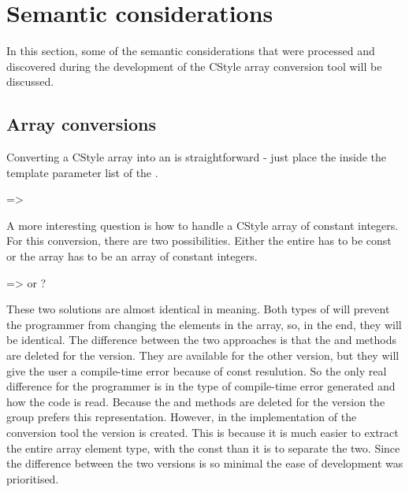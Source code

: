 
\section{Semantic considerations}

In this section, some of the semantic considerations that were processed and discovered during the development of the CStyle array conversion tool will be discussed. 

\subsection{Array conversions} \label{subsec:095:030:array_conversions}

Converting a CStyle  array into an  is straightforward - just place the  inside the template parameter list of the . 

 => 

A more interesting question is how to handle a CStyle array of constant integers. For this conversion, there are two possibilities. Either the entire  has to be const or the array has to be an array of constant integers.

 =>  or ?

These two solutions are almost identical in meaning. Both types of  will prevent the programmer from changing the elements in the array, so, in the end, they will be identical. The difference between the two approaches is that the  and  methods are deleted for the  version. They are available for the other version, but they will give the user a compile-time error because of const resulution. So the only real difference for the programmer is in the type of compile-time error generated and how the code is read. Because the  and  methods are deleted for the  version the group prefers this representation. However, in the implementation of the conversion tool the  version is created. This is because it is much easier to extract the entire array element type, with the const than it is to separate the two. Since the difference between the two versions is so minimal the ease of development was prioritised.

